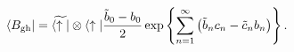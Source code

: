 \begin{equation}
 \langle B_{\rm gh} |
 = \widetilde{ \langle \uparrow |} \otimes \langle \uparrow |
    {{{\tilde b}_0-b_0} \over 2}
        \exp
        \left\{
        \sum_{n=1}^\infty
        \left(
         {\tilde b}_n c_n - {\tilde c}_n b_n
        \right)
        \right\}.
\end{equation}

